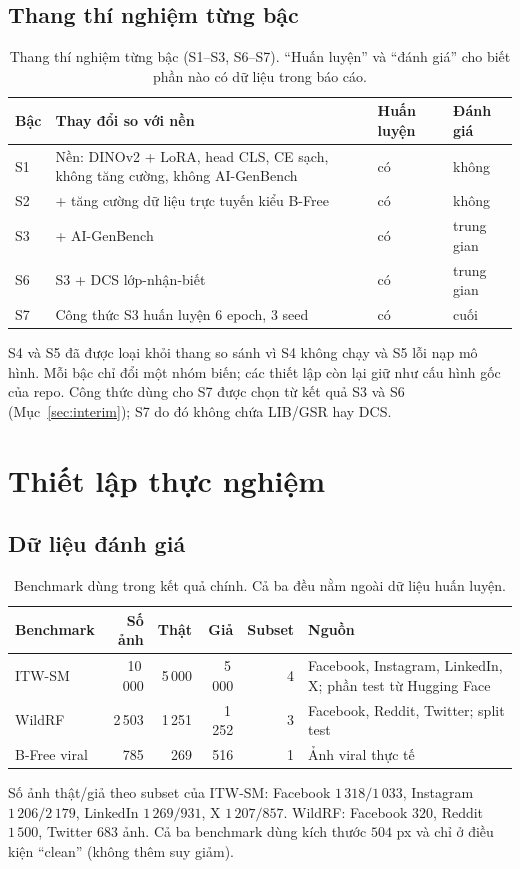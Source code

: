 \documentclass[11pt,a4paper]{article}
\begin{document}
\subsection{Thang thí nghiệm từng bậc}
\begin{table}[htbp]\centering\small
\caption{Thang thí nghiệm từng bậc (S1--S3, S6--S7). ``Huấn luyện'' và ``đánh giá'' cho biết phần nào có dữ liệu trong báo cáo.}\label{tab:ladder}
\begin{tabularx}{\linewidth}{l X l l}
\toprule
Bậc & Thay đổi so với nền & Huấn luyện & Đánh giá \\
\midrule
S1 & Nền: DINOv2 + LoRA, head CLS, CE sạch, không tăng cường, không AI-GenBench & có & không \\
S2 & + tăng cường dữ liệu trực tuyến kiểu B-Free & có & không \\
S3 & + AI-GenBench & có & trung gian \\
S6 & S3 + DCS lớp-nhận-biết & có & trung gian \\
S7 & Công thức S3 huấn luyện 6 epoch, 3 seed & có & cuối \\
\bottomrule
    \end{tabularx}
    \end{table}
    \noindent S4 và S5 đã được loại khỏi thang so sánh vì S4 không chạy và S5 lỗi nạp mô hình.
Mỗi bậc chỉ đổi một nhóm biến; các thiết lập còn lại giữ như cấu hình gốc của repo. Công thức dùng cho S7 được chọn từ kết quả S3 và S6 (Mục~\ref{sec:interim}); S7 do đó không chứa LIB/GSR hay DCS.

\section{Thiết lập thực nghiệm}\label{sec:setup}

\subsection{Dữ liệu đánh giá}
\begin{table}[htbp]\centering\small
\caption{Benchmark dùng trong kết quả chính. Cả ba đều nằm ngoài dữ liệu huấn luyện.}\label{tab:bench}
\begin{tabularx}{\linewidth}{l r r r r X}
\toprule
Benchmark & Số ảnh & Thật & Giả & Subset & Nguồn \\
\midrule
ITW-SM~\cite{konstantinidou2026navigating} & 10\,000 & 5\,000 & 5\,000 & 4 & Facebook, Instagram, LinkedIn, X; phần test từ Hugging Face \\
WildRF~\cite{cavia2024realtime} & 2\,503 & 1\,251 & 1\,252 & 3 & Facebook, Reddit, Twitter; split test \\
B-Free viral~\cite{guillaro2025bfree} & 785 & 269 & 516 & 1 & Ảnh viral thực tế \\
\bottomrule
\end{tabularx}
\end{table}
Số ảnh thật/giả theo subset của ITW-SM: Facebook $1\,318/1\,033$, Instagram $1\,206/2\,179$, LinkedIn $1\,269/931$, X $1\,207/857$. WildRF: Facebook $320$, Reddit $1\,500$, Twitter $683$ ảnh. Cả ba benchmark dùng kích thước $504$ px và chỉ ở điều kiện ``clean'' (không thêm suy giảm).
\end{document}
